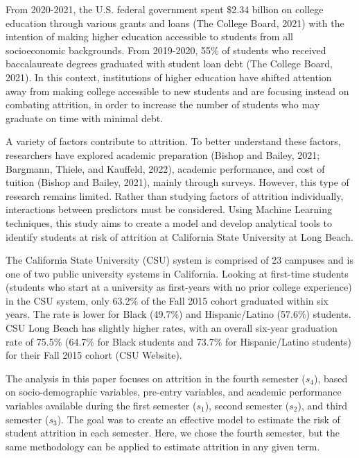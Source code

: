 \documentclass[notitlepage,12pt]{jedm}
\begin{document}
\par From 2020-2021, the U.S. federal government spent \$2.34 billion on college education through various grants and loans (The College Board, 2021) with the intention of making higher education accessible to students from all socioeconomic backgrounds. From 2019-2020, 55\% of students who received baccalaureate degrees graduated with student loan debt (The College Board, 2021). In this context, institutions of higher education have shifted attention away from making college accessible to new students and are focusing instead on combating attrition, in order to increase the number of students who may graduate on time with minimal debt. 


\par A variety of factors contribute to attrition. To better understand these factors, researchers have explored academic preparation (Bishop and Bailey, 2021; Bargmann, Thiele, and Kauffeld, 2022), academic performance, and cost of tuition (Bishop and Bailey, 2021), mainly through surveys. However, this type of research remains limited. Rather than studying factors of attrition individually, interactions between predictors must be considered. Using Machine Learning techniques, this study aims to create a model and develop analytical tools to identify students at risk of attrition at California State University at Long Beach. 

\par The California State University (CSU) system is comprised of 23 campuses and is one of two public university systems in California. Looking at first-time students (students who start at a university as first-years with no prior college experience) in the CSU system, only 63.2\% of the Fall 2015 cohort graduated within six years. The rate is lower for Black (49.7\%) and Hispanic/Latino (57.6\%) students. CSU Long Beach has slightly higher rates, with an overall six-year graduation rate of 75.5\% (64.7\% for Black students and 73.7\% for Hispanic/Latino students) for their Fall 2015 cohort (CSU Website). 

\par The analysis in this paper focuses on attrition in the fourth semester ($s_4$), based on socio-demographic variables, pre-entry variables, and academic performance variables available during the first semester ($s_1$), second semester ($s_2$), and third semester ($s_3$). The goal was to create an effective model to estimate the risk of student attrition in each semester. Here, we chose the fourth semester, but the same methodology can be applied to estimate attrition in any given term. 
\end{document}
